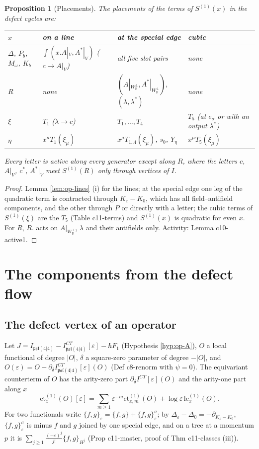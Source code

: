 \documentclass[11pt]{article}
\numberwithin{equation}{section}
\theoremstyle{plain}
\newtheorem{proposition}[theorem]{Proposition}
\theoremstyle{definition}
\newcommand{\Ap}{A|_{W_{\mathbb R}^\perp}}
\newcommand{\AV}{A|_V}
\newcommand{\psl}{\mathfrak{psl}(4|4)}
\newcommand{\lc}{\mathrm{lc}}
\newcommand{\ct}{\mathrm{ct}}
\begin{document}
\begin{proposition}[Placements]
\label{prop:op-placements}
The placements of the terms of $S^{(1)}(x)$ in the defect cycles are:
\begin{center}
\begin{tabular}{l|l|l|l}
$x$ & on a line & at the special edge & cubic\\
\hline
$\Delta$, $P_b$, $M_\omega$, $K_b$ & $\int(x.\AV,A^*|_V)$ ($c\to\AV$) & all five slot pairs & none\\
$R$ & none & $(\Ap,A^*|_{W_{\mathbb R}^\perp})$, $(\lambda,\lambda^*)$ & none\\
$\xi$ & $T_1$ ($\lambda\to c$) & $T_1,\dots,T_4$ & $T_5$ (at $e_\sigma$ or with an output $\lambda^*$)\\
$\eta$ & $x^\mu T_1(\xi_\mu)$ & $x^\mu T_{1..4}(\xi_\mu)$, $s_0$, $Y_\eta$ & $x^\mu T_5(\xi_\mu)$
\end{tabular}
\end{center}
Every letter is active along every generator except along $R$, where the letters $c$, $\AV$, $c^*$, $A^*|_V$ meet $S^{(1)}(R)$ only through vertices of $I$.
\end{proposition}

\begin{proof}
Lemma \ref{lem:op-lines} (i) for the lines; at the special edge one leg of the quadratic term is contracted through $K_\varepsilon-K_0$, which has all field--antifield components, and the other through $P$ or directly with a letter; the cubic terms of $S^{(1)}(\xi)$ are the $T_5$ (Table c11-terms) and $S^{(1)}(x)$ is quadratic for even $x$. For $R$, $R.$ acts on $\Ap$, $\lambda$ and their antifields only. Activity: Lemma c10-active1.
\end{proof}

\section{The components from the defect flow}
\label{sec:op-master}

\subsection{The defect vertex of an operator}

Let $J=I_{\psl}-I^{CT}_{\psl}[\varepsilon]-\hbar F_1$ (Hypothesis \ref{hyp:op-A}), $O$ a local functional of degree $|O|$, $\delta$ a square-zero parameter of degree $-|O|$, and $O(\varepsilon)=O-\partial_\delta I^{CT}_{\psl}[\varepsilon](O)$ (Def c8-renorm with $\psi=0$). The equivariant counterterm of $O$ has the arity-zero part $\partial_\delta I^{CT}[\varepsilon](O)$ and the arity-one part along $x$
\[
\ct^{(1)}_x(O)[\varepsilon]=\sum_{m\ge1}\varepsilon^{-m}\ct^{(1)}_{x,m}(O)+\log\varepsilon\,\lc^{(1)}_x(O).
\]
For two functionals write $\{f,g\}_\varepsilon=\{f,g\}+\{f,g\}^\sigma_\varepsilon$; by $\Delta_\varepsilon-\Delta_0=-\partial_{K_\varepsilon-K_0}$, $\{f,g\}^\sigma_\varepsilon$ is minus $f$ and $g$ joined by one special edge, and on a tree at a momentum $p$ it is $\sum_{j\ge1}\frac{(-\varepsilon)^j}{j!}\{f,g\}_{H^j}$ (Prop c11-master, proof of Thm c11-classes (iii)).
\end{document}
